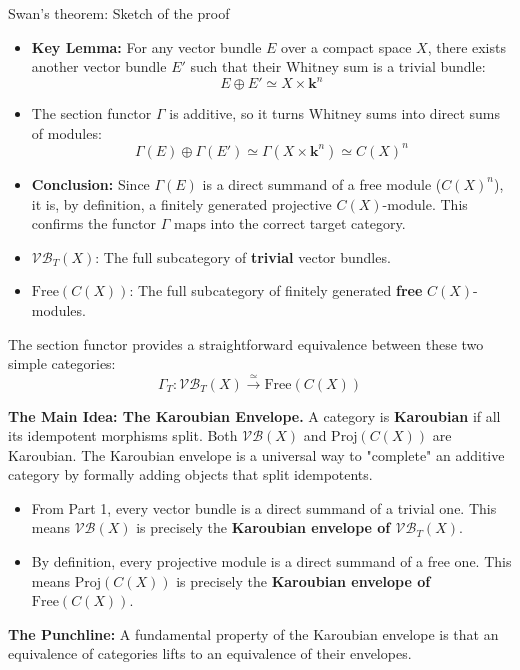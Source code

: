 \documentclass[10pt]{beamer}
\begin{document}
\begin{frame}[allowframebreaks]{Swan's theorem: Sketch of the proof}
	\begin{itemize}
		\item \textbf{Key Lemma:} For any vector bundle $E$ over a compact space $X$, there exists another vector bundle $E'$ such that their Whitney sum is a trivial bundle:
		\[ E \oplus E' \simeq X \times \mathbf{k}^n \]
		\item The section functor $\Gamma$ is additive, so it turns Whitney sums into direct sums of modules:
		\[ \Gamma(E) \oplus \Gamma(E') \simeq \Gamma(X \times \mathbf{k}^n) \simeq C(X)^n \]
		\item \textbf{Conclusion:} Since $\Gamma(E)$ is a direct summand of a free module ($C(X)^n$), it is, by definition, a finitely generated projective $C(X)$-module. This confirms the functor $\Gamma$ maps into the correct target category.
	\end{itemize}
	\framebreak
	\begin{itemize}
		\item $\mathcal{VB}_T(X)$: The full subcategory of \textbf{trivial} vector bundles.
		\item $\mathrm{Free}(C(X))$: The full subcategory of finitely generated \textbf{free} $C(X)$-modules.
	\end{itemize}
	The section functor provides a straightforward equivalence between these two simple categories:
	\[ \Gamma_T: \mathcal{VB}_T(X) \stackrel{\simeq}{\longrightarrow} \mathrm{Free}(C(X)) \]
	
	\framebreak
	
	\textbf{The Main Idea: The Karoubian Envelope.}
	A category is \textbf{Karoubian} if all its idempotent morphisms split. Both $\mathcal{VB}(X)$ and $\mathrm{Proj}(C(X))$ are Karoubian. The Karoubian envelope is a universal way to "complete" an additive category by formally adding objects that split idempotents.
	
	\begin{itemize}
		\item From Part 1, every vector bundle is a direct summand of a trivial one. This means $\mathcal{VB}(X)$ is precisely the \textbf{Karoubian envelope of $\mathcal{VB}_T(X)$}.
		
		\item By definition, every projective module is a direct summand of a free one. This means $\mathrm{Proj}(C(X))$ is precisely the \textbf{Karoubian envelope of $\mathrm{Free}(C(X))$}.
	\end{itemize}
	
	\textbf{The Punchline:} A fundamental property of the Karoubian envelope is that an equivalence of categories lifts to an equivalence of their envelopes.
\end{frame}
\end{document}

